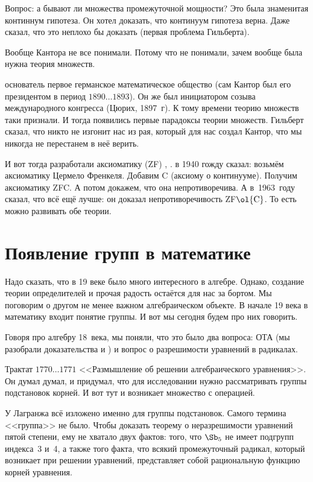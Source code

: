 \documentclass[a4paper,oneside,fleqn,10pt]{article}
\newcommand{\pe}[2]{${#1}\ldots{#2}$}
\begin{document}
Вопрос: а бывают ли множества промежуточной мощности? Это была знаменитая континнум гипотеза.
Он хотел доказать, что континуум гипотеза верна. Даже  сказал, что это неплохо бы
доказать (первая проблема Гильберта).

Вообще Кантора не все понимали. Потому что не понимали, зачем вообще была нужна теория множеств.

 основатель первое германское математическое общество (сам Кантор был его
президентом в период \pe{1890}{1893}).
Он же был инициатором созыва международного конгресса (Цюрих, 1897~г).
К тому времени теорию множеств таки признали. И тогда появились первые парадоксы
теории множеств. Гильберт сказал, что никто не изгонит нас из рая, который для нас создал Кантор,
что мы никогда не перестанем в неё верить.

И вот тогда разработали аксиоматику (ZF) , .
 в 1940 гожду сказал: возьмём аксиоматику Цермело Френкеля.
Добавим C (аксиому о континууме). Получим аксиоматику ZFC.
А потом докажем, что она непротиворечива.
А в~1963~году  сказал, что всё ещё лучше:
он доказал непротиворечивость ZF$\ol{\rm C}$.
То есть можно развивать обе теории.


\section{Появление групп в математике}

Надо сказать, что в 19 веке было много интересного в алгебре.
Однако, создание теории определителей и прочая радость остаётся для нас за бортом.
Мы поговорим о другом не менее важном алгебраическом объекте.
В начале 19 века в математику входит понятие группы. И вот мы сегодня будем
про них говорить.

Говоря про алгебру 18~века, мы поняли, что это было два вопроса: ОТА (мы разобрали доказательства 
и ) и вопрос о разрешимости уравнений в радикалах.

Трактат  \pe{1770}{1771} <<Размышление об решении алгебраического уравнения>>.
Он думал думал, и придумал, что для исследовании нужно рассматривать группы подстановок
корней. И вот тут и возникает множество с операцией.

У Лагранжа всё изложено именно для группы подстановок. Самого термина <<группа>> не было.
Чтобы доказать теорему о неразрешимости уравнений пятой степени, ему
не хватало двух фактов: того, что $\Sb_5$ не имеет подгрупп индекса~3 и~4,
а также того факта, что всякий промежуточный радикал, который возникает при решении
уравнений, представляет собой рациональную функцию корней уравнения.
\end{document}
